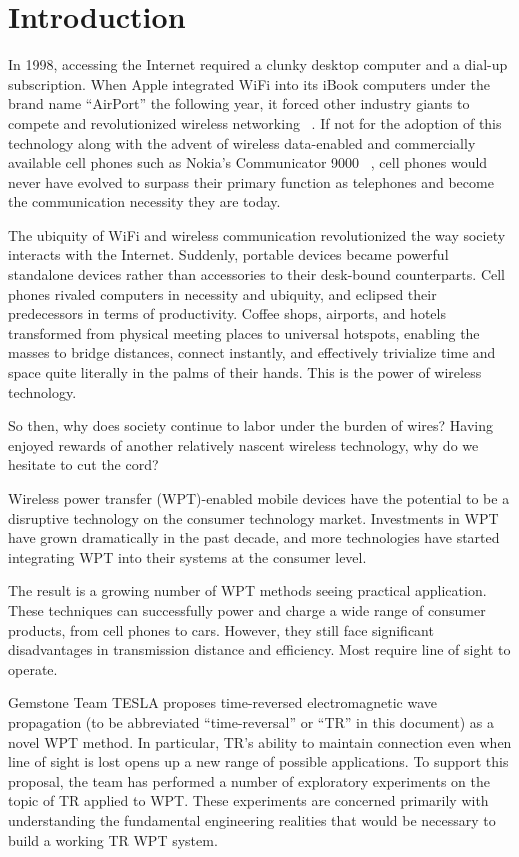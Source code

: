 \chapter{Introduction}
\label{ch:introduction}

In 1998, accessing the Internet required a clunky desktop computer and a dial-up
subscription. When Apple integrated WiFi into its iBook computers under the
brand name ``AirPort'' the following year, it forced other industry giants to
compete and revolutionized wireless networking ~\cite{_brief_2004}. If not for
the adoption of this technology along with the advent of wireless data-enabled
and commercially available cell phones such as Nokia’s Communicator 9000
~\cite{_first_1996}, cell phones would never have evolved to surpass their
primary function as telephones and become the communication necessity they are
today.

The ubiquity of WiFi and wireless communication revolutionized the way society
interacts with the Internet. Suddenly, portable devices became powerful
standalone devices rather than accessories to their desk-bound counterparts.
Cell phones rivaled computers in necessity and ubiquity, and eclipsed their
predecessors in terms of productivity. Coffee shops, airports, and hotels
transformed from physical meeting places to universal hotspots, enabling the
masses to bridge distances, connect instantly, and effectively trivialize time
and space quite literally in the palms of their hands. This is the power of
wireless technology.

So then, why does society continue to labor under the burden of wires? Having
enjoyed rewards of another relatively nascent wireless technology, why do we
hesitate to cut the cord?

Wireless power transfer (WPT)-enabled mobile devices have the potential to be a
disruptive technology on the consumer technology market.  Investments in WPT
have grown dramatically in the past decade, and more technologies have started
integrating WPT into their systems at the consumer level.

The result is a growing number of WPT methods seeing practical application.
These techniques can successfully power and charge a wide range of consumer
products, from cell phones to cars.  However, they still face significant
disadvantages in transmission distance and efficiency.  Most require line of
sight to operate.

Gemstone Team TESLA proposes time-reversed electromagnetic wave propagation (to
be abbreviated ``time-reversal'' or ``TR'' in this document) as a novel WPT method.
In particular, TR's ability to maintain connection even when line of sight is
lost opens up a new range of possible applications.  To support this proposal,
the team has performed a number of exploratory experiments on the topic of TR
applied to WPT.  These experiments are concerned primarily with understanding
the fundamental engineering realities that would be necessary to build a working
TR WPT system.

